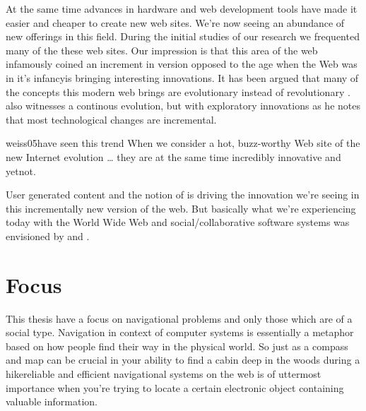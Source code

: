 At the same time advances in hardware and web development tools have made it
easier and cheaper to create new web sites. We're now seeing an
abundance of new offerings in this field.
During the initial studies of our research we frequented
many of the these web sites. Our impression is that
this area of the web infamously coined \dash{}an
increment in version opposed to the age when the Web was in it's
infancy\dash{}is bringing interesting innovations.
It has been argued that many of the concepts this modern web brings are
evolutionary instead of revolutionary \citep[p.~45]{yakovlev07}.
\citet[p.~17]{treese06} also witnesses a continous evolution, but with
exploratory innovations as he notes that most technological changes are
incremental.
\begin{fullquote}[p.~18]{weiss05}{have seen this trend}
  When we consider a hot, buzz-worthy Web site of the new Internet evolution
  \ldots
  they are at the same time incredibly innovative and yet\dash{}not.
\end{fullquote}

User generated content and the notion of %
is driving the innovation we're seeing in this incrementally new version of
the web. But basically what we're experiencing today with the World Wide Web
and social/collaborative software systems was envisioned by \citet{bush45}
and \citet{licklider68}.

\section{Focus}

This thesis have a focus on navigational problems and only those
which are of a social type.%
Navigation in context of computer systems is
essentially a metaphor based on how people find their way in the physical
world. So just as a compass and map can be crucial in your ability to find a
cabin deep in the woods during a hike\dash{}reliable and efficient
navigational systems on the web is of uttermost importance when you're trying
to locate a certain electronic object containing valuable information.


